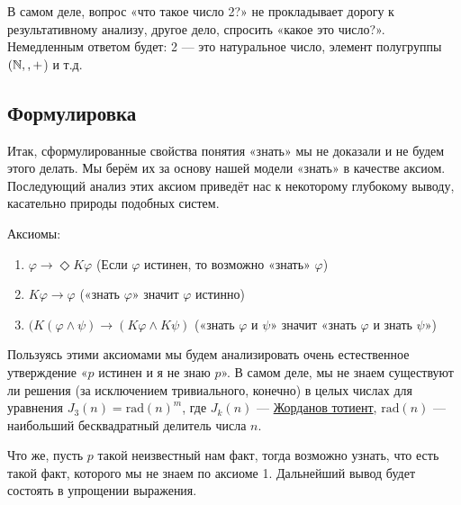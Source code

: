 \documentclass[openany]{book}
\theoremstyle{plain}
\theoremstyle{definition}
\begin{document}
В самом деле, вопрос «что такое число 2?» не прокладывает дорогу к результативному анализу, другое дело, спросить «какое это число?». Немедленным ответом будет: 2 — это натуральное число, элемент полугруппы \((\mathbb{N}, \\, +\)) и т.д.

\subsection{ Формулировка }

Итак, сформулированные свойства понятия «знать» мы не доказали и не будем этого делать. Мы берём их за основу нашей модели «знать» в качестве аксиом. Последующий анализ этих аксиом приведёт нас к некоторому глубокому выводу, касательно природы подобных систем.

Аксиомы:
\begin{enumerate}
\item \(\varphi \to \Diamond K \varphi\) (Если \(\varphi\) истинен, то возможно «знать» \(\varphi\))
\item \(K\varphi \to \varphi\) («знать \(\varphi\)» значит \(\varphi\) истинно)
\item \((K(\varphi \land \psi) \to (K\varphi \land K\psi)\) («знать \(\varphi\) и \(\psi\)» значит «знать \(\varphi\) и знать \(\psi\)»)
\end{enumerate}

Пользуясь этими аксиомами мы будем анализировать очень естественное утверждение «\(p\) истинен и я не знаю \(p\)». В самом деле, мы не знаем существуют ли решения (за исключением тривиального, конечно) в целых числах для уравнения \(J_3(n) = \mathrm{rad}(n)^m\), где \(J_k(n)\) — \href{https://ru.wikipedia.org/wiki/Жорданов_тотиент}{Жорданов тотиент}, \(\mathrm{rad}(n)\) — наибольший бесквадратный делитель числа \(n\).

Что же, пусть \(p\) такой неизвестный нам факт, тогда возможно узнать, что есть такой факт, которого мы не знаем по аксиоме 1. Дальнейший вывод будет состоять в упрощении выражения.
\end{document}
